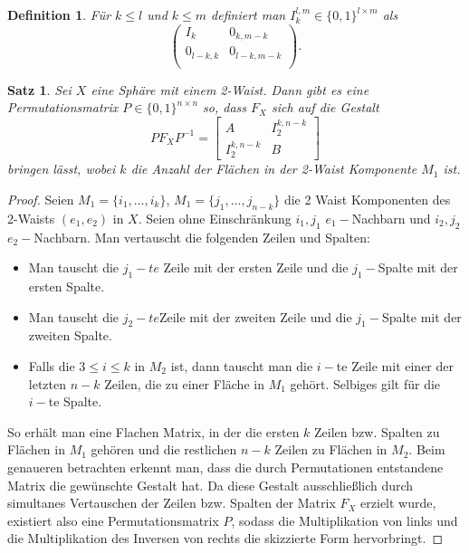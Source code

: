 \documentclass[12pt,titlepage,twoside,cleardoublepage]{article}
\theoremstyle{nummermitklammern}
\newtheorem{definition}[temp]{Definition}
\newtheorem{satz}[temp]{Satz}
\newtheorem{definition}[zahl]{Definition}
\newtheorem{satz}[zahl]{Satz}
\numberwithin{equation}{section}
\begin{document}
\begin{definition}
Für $k\leq l$ und $k\leq m$ definiert man $I^{l,m}_k\in \{0,1\}^{l \times m}$ als
\[
\left( 
\begin{array}{cccc} 
  I_k & 0_{k,m-k} \\
  0_{l-k,k} & 0_{l-k,m-k}\\
\end{array} 
\right).
\]
\end{definition}

\begin{satz}
Sei $X$ eine Sphäre mit einem 2-Waist. Dann gibt es eine Permutationsmatrix $P\in \{0,1\}^{n\times n}$ so, dass $F_X$ sich auf die Gestalt 
\[
PF_XP^{-1}=
\left[ 
\begin{array}{c|c} 
  A & I^{k,n-k}_2 \\ 
  \hline 
  I^{k,n-k}_2 & B 
\end{array} 
\right]
\] 
bringen lässt, wobei $k$ die Anzahl der Flächen in der 2-Waist Komponente $M_1$ ist.
\end{satz}
\begin{proof}
Seien $M_1=\{i_1,\ldots,i_k\}$, $M_1=\{j_1,\ldots,j_{n-k}\}$ die 2 Waist Komponenten des 2-Waists $(e_1,e_2)$ in $X$. Seien ohne Einschränkung $i_1,j_1$ $e_1-$Nachbarn und $i_2,j_2$ $e_2-$Nachbarn. Man vertauscht die folgenden Zeilen und Spalten:
\begin{itemize}
\item Man tauscht die $j_1-te$ Zeile mit der ersten Zeile und die  $j_1-$Spalte mit der ersten Spalte.
\item Man tauscht die $j_2-te$Zeile mit der zweiten Zeile und die  $j_1-$Spalte mit der zweiten Spalte.
\item Falls die $3\leq i \leq k$ in $M_2$ ist, dann tauscht man die $i-$te Zeile mit einer der letzten $n-k$ Zeilen, die zu einer Fläche in $M_1$ gehört. Selbiges gilt für die $i-$te Spalte.
\end{itemize} 
So erhält man eine Flachen Matrix, in der die ersten $k$ Zeilen bzw. Spalten zu  Flächen in $M_1$ gehören und die restlichen $n-k$ Zeilen zu Flächen in $M_2$. Beim genaueren betrachten erkennt man, dass die durch Permutationen entstandene Matrix die gewünschte Gestalt hat. Da diese Gestalt ausschließlich durch simultanes Vertauschen der Zeilen bzw. Spalten der Matrix $F_X$ erzielt wurde, existiert also eine Permutationsmatrix $P$, sodass die Multiplikation von links und die Multiplikation des Inversen von rechts  die skizzierte Form hervorbringt.
\end{proof}
\end{document}
